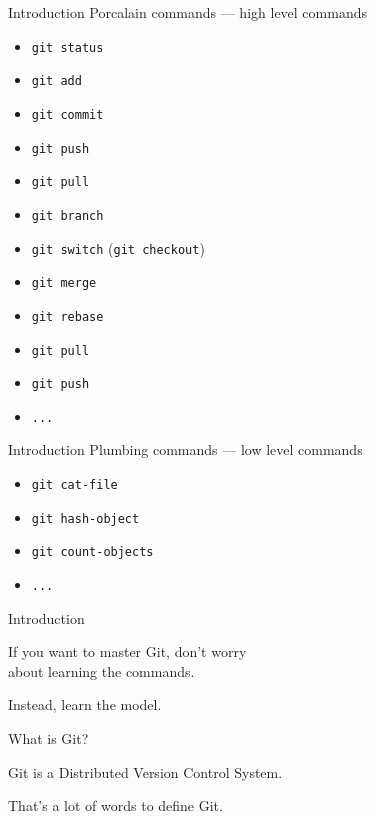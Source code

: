 \documentclass{beamer}
\begin{document}
    \begin{frame}{Introduction}
        Porcalain commands --- high level commands
        \begin{itemize}
            \item\texttt{git status}
            \item\texttt{git add}
            \item\texttt{git commit}
            \item\texttt{git push}
            \item\texttt{git pull}
            \item\texttt{git branch}
            \item\texttt{git switch} (\texttt{git checkout})
            \item\texttt{git merge}
            \item\texttt{git rebase}
            \item\texttt{git pull}
            \item\texttt{git push}
            \item\texttt{...}
        \end{itemize}
    \end{frame}

    \begin{frame}{Introduction}
        Plumbing commands --- low level commands
        \begin{itemize}
            \item\texttt{git cat-file}
            \item\texttt{git hash-object}
            \item\texttt{git count-objects}
            \item\texttt{...}
        \end{itemize}
    \end{frame}

    \begin{frame}{Introduction}
        \begin{center}
            If you want to master \alert{Git}, don't worry\\about learning the commands.
        \end{center}
        \pause
        \begin{center}
            Instead, learn the model.
        \end{center}
    \end{frame}

    \begin{frame}{What is Git?}
        \begin{center}
            \alert{Git} is a Distributed Version Control System.
        \end{center}
        \pause
        \begin{center}
            That’s a lot of words to define Git.
        \end{center}
    \end{frame}
\end{document}

